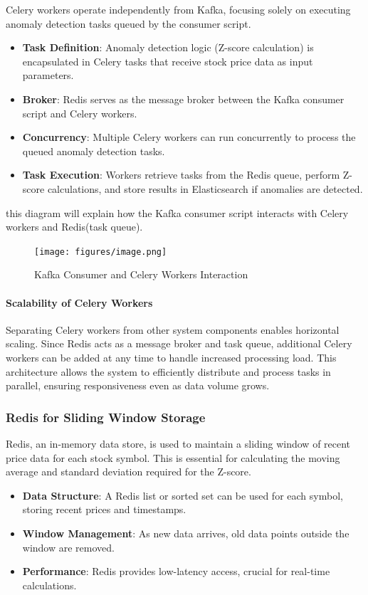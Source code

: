 Celery workers operate independently from Kafka, focusing solely on executing anomaly detection tasks queued by the consumer script.
\begin{itemize}
    \item \textbf{Task Definition}: Anomaly detection logic (Z-score calculation) is encapsulated in Celery tasks that receive stock price data as input parameters.
    \item \textbf{Broker}: Redis serves as the message broker between the Kafka consumer script and Celery workers.
    \item \textbf{Concurrency}: Multiple Celery workers can run concurrently to process the queued anomaly detection tasks.
    \item \textbf{Task Execution}: Workers retrieve tasks from the Redis queue, perform Z-score calculations, and store results in Elasticsearch if anomalies are detected.
\end{itemize}


this diagram will explain how the Kafka consumer script interacts with Celery workers and Redis(task queue).

\begin{figure}[H]
    \centering
    \texttt{[image: figures/image.png]}
    \caption{Kafka Consumer and Celery Workers Interaction}
    \label{fig:consumer_celery_diagram}
\end{figure}

\paragraph{Scalability of Celery Workers}
Separating Celery workers from other system components enables horizontal scaling. Since Redis acts as a message broker and task queue, additional Celery workers can be added at any time to handle increased processing load. This architecture allows the system to efficiently distribute and process tasks in parallel, ensuring responsiveness even as data volume grows.

\subsubsection{Redis for Sliding Window Storage}

Redis, an in-memory data store, is used to maintain a sliding window of recent price data for each stock symbol. This is essential for calculating the moving average and standard deviation required for the Z-score.
\begin{itemize}
    \item \textbf{Data Structure}: A Redis list or sorted set can be used for each symbol, storing recent prices and timestamps.
    \item \textbf{Window Management}: As new data arrives, old data points outside the window are removed.
    \item \textbf{Performance}: Redis provides low-latency access, crucial for real-time calculations.
\end{itemize}

